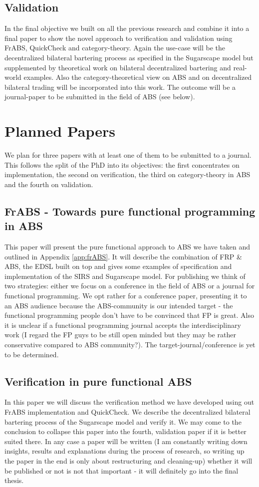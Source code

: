 \subsection{Validation}
In the final objective we built on all the previous research and combine it into a final paper to show the novel approach to verification and validation using FrABS, QuickCheck and category-theory. Again the use-case will be the decentralized bilateral bartering process as specified in the Sugarscape model but supplemented by theoretical work on bilateral decentralized bartering and real-world examples. Also the category-theoretical view on ABS and on decentralized bilateral trading will be incorporated into this work. The outcome will be a journal-paper to be submitted in the field of ABS (see below).

\section{Planned Papers}
We plan for three papers with at least one of them to be submitted to a journal. This follows the split of the PhD into its objectives: the first concentrates on implementation, the second on verification, the third on category-theory in ABS and the fourth on validation. 

\subsection{FrABS - Towards pure functional programming in ABS}
This paper will present the pure functional approach to ABS we have taken and outlined in Appendix \ref{app:frABS}. It will describe the combination of FRP \& ABS, the EDSL built on top and gives some examples of specification and implementation of the SIRS and Sugarscape model.
For publishing we think of two strategies: either we focus on a conference in the field of ABS or a journal for functional programming. We opt rather for a conference paper, presenting it to an ABS audience because the ABS-community is our intended target - the functional programming people don't have to be convinced that FP is great. Also it is unclear if a functional programming journal accepts the interdisciplinary work (I regard the FP guys to be still open minded but they may be rather conservative compared to ABS community?). The target-journal/conference is yet to be determined.

\subsection{Verification in pure functional ABS}
In this paper we will discuss the verification method we have developed using out FrABS implementation and QuickCheck. We describe the decentralized bilateral bartering process of the Sugarscape model and verify it.
We may come to the conclusion to collapse this paper into the fourth, validation paper if it is better suited there. In any case a paper will be written (I am constantly writing down insights, results and explanations during the process of research, so writing up the paper in the end is only about restructuring and cleaning-up) whether it will be published or not is not that important - it will definitely go into the final thesis.

